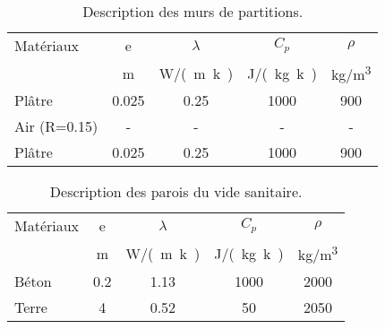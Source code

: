 \begin{table}
    \begin{tabular}{l *4{c}}
        \toprule
        Matériaux         & e         & $\lambda$      & $C_{p}$         & $\rho$          \\
                          & \si{m}  & \si{W/(m.k)} & \si{J/(kg.k)} &\si{kg/m^{3}}  \\
        \midrule
        Plâtre            & 0.025     & 0.25           & 1000            & 900             \\
        Air (R=0.15)      & -         & -              & -               & -               \\
        Plâtre            & 0.025     & 0.25           & 1000            & 900             \\
        \bottomrule
    \end{tabular}
    \caption{Description des murs de partitions.}
    \label{tab:compo_partition}
\end{table}

\begin{table}
    \begin{tabular}{l *4{c}}
        \toprule
        Matériaux         & e         & $\lambda$      & $C_{p}$         & $\rho$          \\
                          & \si{m}  & \si{W/(m.k)} & \si{J/(kg.k)} &\si{kg/m^{3}}  \\
        \midrule
        Béton             & 0.2       & 1.13           & 1000            & 2000            \\
        Terre             & 4         & 0.52           & 50              & 2050            \\
        \bottomrule
    \end{tabular}
    \caption{Description des parois du vide sanitaire.}
    \label{tab:compo_VS}
\end{table}


